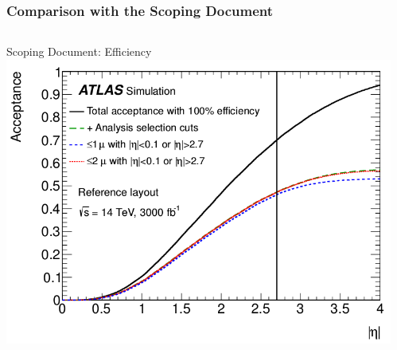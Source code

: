 \documentclass{beamer}
\begin{document}

\begin{frame}[t]
\frametitle{Comparison with the Scoping Document}
\begin{columns}
\begin{column}{.6\textwidth}
\centering
Scoping Document: Efficiency
\includegraphics[width=\textwidth]{scopingAcceptance}
\end{column}
\begin{column}{.4\textwidth}
\end{column}
\end{columns}

\medskip
\begin{center}
\end{center}
\end{frame}

\end{document}
